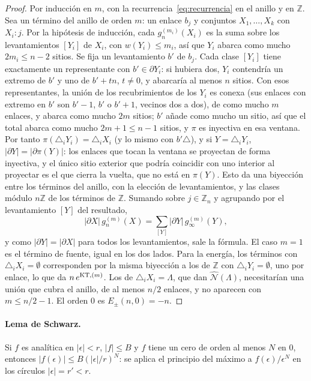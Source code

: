 \documentclass[11pt,a4paper]{article}
\theoremstyle{remark}
\begin{document}
\begin{proof}
Por inducción en $m$, con la recurrencia~\eqref{eq:recurrencia} en el anillo y en $\mathbb Z$. Sea un
término del anillo de orden $m$: un enlace $b_j$ y conjuntos $X_1,\dots,X_k$ con $X_i:j$. Por la
hipótesis de inducción, cada $g_n^{(m_i)}(X_i)$ es la suma sobre los levantamientos $[Y_i]$ de $X_i$,
con $w(Y_i)\le m_i$, así que $Y_i$ abarca como mucho $2m_i\le n-2$ sitios. Se fija un levantamiento
$b'$ de $b_j$. Cada clase $[Y_i]$ tiene exactamente un representante con $b'\in\partial Y_i$: si
hubiera dos, $Y_i$ contendría un extremo de $b'$ y uno de $b'+tn$, $t\ne0$, y abarcaría al menos $n$
sitios. Con esos representantes, la unión de los recubrimientos de los $Y_i$ es conexa (sus enlaces con
extremo en $b'$ son $b'-1$, $b'$ o $b'+1$, vecinos dos a dos), de como mucho $m$ enlaces, y abarca como
mucho $2m$ sitios; $b'$ añade como mucho un sitio, así que el total abarca como mucho $2m+1\le n-1$
sitios, y $\pi$ es inyectiva en esa ventana. Por tanto $\pi(\triangle_iY_i)=\triangle_iX_i$ (y lo mismo con
$b'\triangle$), y si $Y=\triangle_iY_i$, $|\partial Y|=|\partial\pi(Y)|$: los enlaces que tocan la ventana se
proyectan de forma inyectiva, y el único sitio exterior que podría coincidir con uno interior al
proyectar es el que cierra la vuelta, que no está en $\pi(Y)$. Esto da una biyección entre
los términos del anillo, con la elección de levantamientos, y las clases módulo $n\mathbb Z$ de los
términos de $\mathbb Z$. Sumando sobre $j\in\mathbb Z_n$ y agrupando por el levantamiento $[Y]$ del
resultado,
\[
  |\partial X|\,g_n^{(m)}(X)=\sum_{[Y]}|\partial Y|\,g_\infty^{(m)}(Y),
\]
y como $|\partial Y|=|\partial X|$ para todos los levantamientos, sale la fórmula. El caso $m=1$ es el
término de fuente, igual en los dos lados. Para la energía, los términos con $\triangle_iX_i=\emptyset$
corresponden por la misma biyección a los de $\mathbb Z$ con $\triangle_iY_i=\emptyset$, uno por enlace,
lo que da $n\,e^{{\rm KT},(m)}$. Los de $\triangle_iX_i=\Lambda$, que dan $\widehat{\mathcal N}(\Lambda)$,
necesitarían una unión que cubra el anillo, de al menos $n/2$ enlaces, y no aparecen con $m\le n/2-1$.
El orden $0$ es $E_\pm(n,0)=-n$.
\end{proof}

\paragraph{Lema de Schwarz.} Si $f$ es analítica en $|\epsilon|<r$, $|f|\le B$ y $f$ tiene un cero
de orden al menos $N$ en $0$, entonces $|f(\epsilon)|\le B(|\epsilon|/r)^N$: se aplica el principio del
máximo a $f(\epsilon)/\epsilon^N$ en los círculos $|\epsilon|=r'<r$.
\end{document}
